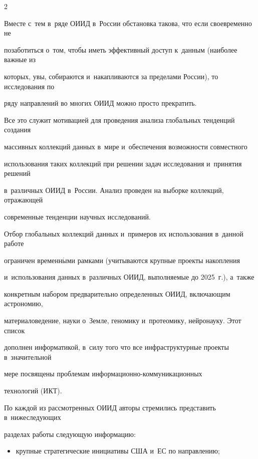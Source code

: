 \begin{multicols}{2}
  


  Вместе с~тем в~ряде ОИИД в~России обстановка такова, что если своевременно не 


позаботиться о~том, чтобы иметь эффективный доступ к~данным (наиболее важные из 


которых, увы, собираются и~накапливаются за пределами России), то исследования по 


ряду направлений во многих ОИИД можно просто прекратить.


  


  Все это служит мотивацией для проведения анализа глобальных тенденций создания 


массивных коллекций данных в~мире и~обеспечения возможности совместного 


использования таких коллекций при решении задач исследования и~принятия решений 


в~различных ОИИД в~России. Анализ проведен на выборке коллекций, отражающей 


современные тенденции научных исследований.


  


  Отбор глобальных коллекций данных и~примеров их использования в~данной работе 


ограничен временн$\acute{\mbox{ы}}$ми рамками (учитываются крупные проекты накопления 


и~использования данных в~различных ОИИД, выполняемые до 2025~г.), а~так\-же 


конкретным набором предварительно определенных ОИИД, включающим астрономию, 


материаловедение, науки о~Земле, геномику и~протеомику, нейронауку. Этот список 


дополнен информатикой, в~силу того что все инфраструктурные проекты в~значительной 


мере посвящены проб\-ле\-мам ин\-фор\-ма\-ци\-он\-но-ком\-му\-ни\-ка\-ци\-он\-ных 


технологий (ИКТ).


  


  По каждой из рассмотренных ОИИД авторы стремились представить в~нижеследующих 


разделах работы следующую информацию:


  \begin{itemize}


\item крупные стратегические инициативы США и~ЕС по направлению;



\end{itemize}
\end{multicols}
